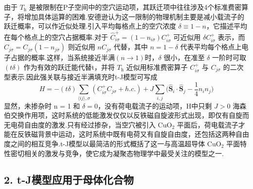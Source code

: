 由于 $T_{\mathrm{h}}$ 是被限制在P子空间中的空穴运动项，其跃迁项中往往涉及4个标准费密算子，将增加具体运算的困难.安德逊认为这一限制的物理机制主要是减小载流子的跃迁概率，可以作近似处理.引入平均每格点上的空穴浓度 $\delta\equiv 1-n$，它描述平均在每个格点上的空穴占据概率.对于 $\hat{C}_{i\sigma}^{+}=(1-n_{i\overline{\sigma}})C_{i\sigma}^{+}$ 可近似用 $\delta C_{i\sigma}^{+}$ 表示，而 $\hat{C}_{j\sigma}=C_{j\sigma}(1-n_{j\overline{\sigma}})$ 则近似用 $nC_{j\sigma}$ 代替，其中 $n=1-\delta$ 代表平均每个格点上电子占据的概率.这样，当系统接近半满$(n\to 1)$时，$\delta$ 很小，在准至 $\delta$ 一阶时可取 $(t\delta)$ 作为有效的跃迁能代替t，并将 $T_{\mathrm{h}}$ 近似用标准费密算子 $C_{i\sigma}^{+}$ 与 $C_{j\sigma}$ 的二次型表示.因此强关联与接近半满填充时t-J模型可写成
\begin{equation}
  H=-(t\delta)\sum_{\langle ij\rangle,\sigma}(C_{i\sigma}^{+}C_{j\sigma}+h.c.)
  +J\sum_{i,j}\biggl(\hat{\boldsymbol{S}}_{i}\cdot\hat{\boldsymbol{S}}_{j}-\frac{1}{4}n_{i}n_{j}\biggr)
\end{equation}
显然，未掺杂时 n = 1 和 $\delta=0$，没有荷电载流子的运动项，H中只剩 $J>0$ 海森伯交换作用项，这时系统的低能激发仅仅以反铁磁自旋波形式出现，即仅有自旋而无电荷自由度的激发.只有经过掺杂，当空穴被引入 $\mathrm{CuO_{2}}$ 平面后，荷电载流子才能在反铁磁背景中运动，这时系统中既有电荷又有自旋自由度，还包括这两种自由度之间的相互竞争.t-J模型以最简洁的形式概括了这一与高温超导体 $\mathrm{CuO_{2}}$ 平面特性密切相关的激发与竞争，使它成为凝聚态物理学中最受关注的模型之一.

\subsection*{2. t-J模型应用于母体化合物}

